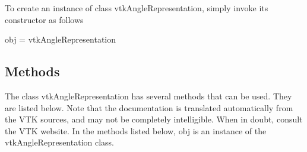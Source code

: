 To create an instance of class vtk\-Angle\-Representation, simply invoke its constructor as follows \begin{DoxyVerb}  obj = vtkAngleRepresentation
\end{DoxyVerb}
 \hypertarget{vtkwidgets_vtkxyplotwidget_Methods}{}\subsection{Methods}\label{vtkwidgets_vtkxyplotwidget_Methods}
The class vtk\-Angle\-Representation has several methods that can be used. They are listed below. Note that the documentation is translated automatically from the V\-T\-K sources, and may not be completely intelligible. When in doubt, consult the V\-T\-K website. In the methods listed below, {\ttfamily obj} is an instance of the vtk\-Angle\-Representation class. 
